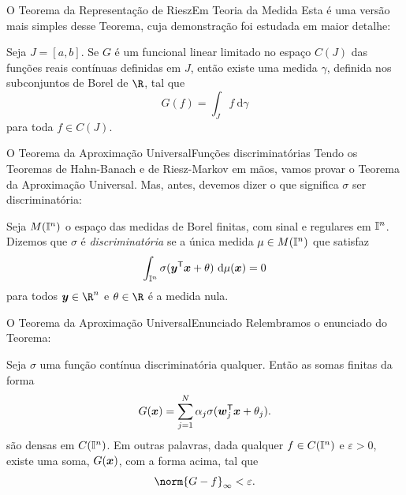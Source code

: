 \documentclass[13pt]{beamer}
\begin{document}
\begin{frame}{O Teorema da Representação de Riesz}{Em Teoria da Medida}
    Esta é uma versão mais simples desse Teorema, cuja demonstração foi estudada em maior detalhe:
    \begin{teo*}
        Seja \( J = [a, b] \).
        Se \( G \) é um funcional linear limitado no espaço \( C ( J ) \) das funções reais contínuas definidas em \( J \), então existe uma medida \( \gamma \), definida nos subconjuntos de Borel de \( \R \), tal que
        \begin{equation*}
            G ( f ) = \int_{ J } f \ \mathrm{d} \gamma
        \end{equation*}
        para toda \( f \in C ( J ) \).
    \end{teo*}
\end{frame}



\begin{frame}{O Teorema da Aproximação Universal}{Funções discriminatórias}
    Tendo os Teoremas de Hahn-Banach e de Riesz-Markov em mãos, vamos provar o Teorema da Aproximação Universal.
    Mas, antes, devemos dizer o que significa \( \sigma \) ser discriminatória:
    \begin{defn*}
        Seja \( M ( \mathbb{I}^{ n } ) \) o espaço das medidas de Borel finitas, com sinal e regulares em \( \mathbb{I}^{ n } \).
        Dizemos que \( \sigma \) é \emph{discriminatória} se a única medida \( \mu \in M ( \mathbb{I}^{ n } ) \) que satisfaz
        \begin{equation*}
            \int_{ \mathbb{I}^{ n } } \sigma ( \bm{y}^{ \mathsf{T} } \bm{x} + \theta ) \ \mathrm{d} \mu (\bm{x}) = 0
        \end{equation*}
        para todos \( \bfy \in \R^{ n } \) e \( \theta \in \R \) é a medida nula.
    \end{defn*}
\end{frame}

\begin{frame}{O Teorema da Aproximação Universal}{Enunciado}
    Relembramos o enunciado do Teorema:
    \begin{TAU}
        Seja \( \sigma \) uma função contínua discriminatória qualquer.
        Então as somas finitas da forma
        \begin{equation*}
            G ( \bm{x} ) = \sum_{ j=1 }^{ N } \alpha_{ j } \sigma ( \bm{w}_{ j }^{ \mathsf{T} } \bm{x} + \theta_{ j } )
        .\end{equation*}
        são densas em \( C ( \mathbb{I}^{ n } ) \).
        Em outras palavras, dada qualquer \( f \in C ( \mathbb{I}^{ n } ) \) e \( \varepsilon > 0 \), existe uma soma, \( G ( \bm{x} ) \), com a forma acima, tal que
        \begin{equation*}
            \norm{ G - f }_{ \infty } < \varepsilon
        .\end{equation*}
    \end{TAU}
\end{frame}
\end{document}

